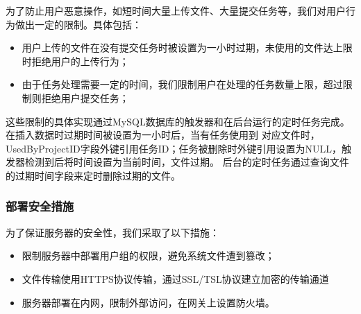 为了防止用户恶意操作，如短时间大量上传文件、大量提交任务等，我们对用户行为做出一定的限制。具体包括：
\begin{itemize}
    \item 用户上传的文件在没有提交任务时被设置为一小时过期，未使用的文件达上限时拒绝用户的上传行为；
    \item 由于任务处理需要一定的时间，我们限制用户在处理的任务数量上限，超过限制则拒绝用户提交任务；
\end{itemize}
这些限制的具体实现通过MySQL数据库的触发器和在后台运行的定时任务完成。在插入数据时过期时间被设置为一小时后，当有任务使用到
对应文件时，UsedByProjectID字段外键引用任务ID；任务被删除时外键引用设置为NULL，触发器检测到后将时间设置为当前时间，文件过期。
后台的定时任务通过查询文件的过期时间字段来定时删除过期的文件。

\subsubsection{部署安全措施}

为了保证服务器的安全性，我们采取了以下措施：
\begin{itemize}
    \item 限制服务器中部署用户组的权限，避免系统文件遭到篡改；
    \item 文件传输使用HTTPS协议传输，通过SSL/TSL协议建立加密的传输通道
    \item 服务器部署在内网，限制外部访问，在网关上设置防火墙。
\end{itemize}